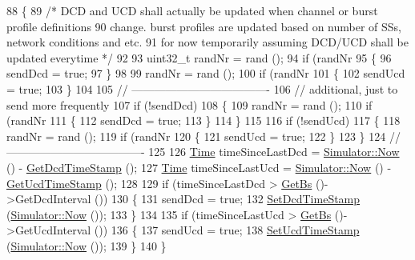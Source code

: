 \begin{DoxyCode}
88 \{
89   \textcolor{comment}{/* DCD and UCD shall actually be updated when channel or burst profile definitions}
90 \textcolor{comment}{   change. burst profiles are updated based on number of SSs, network conditions and etc.}
91 \textcolor{comment}{   for now temporarily assuming DCD/UCD shall be updated everytime */}
92 
93   uint32\_t randNr = rand ();
94   \textcolor{keywordflow}{if} (randNr %
95     \{
96       sendDcd = \textcolor{keyword}{true};
97     \}
98 
99   randNr = rand ();
100   \textcolor{keywordflow}{if} (randNr %
101     \{
102       sendUcd = \textcolor{keyword}{true};
103     \}
104 
105   \textcolor{comment}{// -------------------------------------}
106   \textcolor{comment}{// additional, just to send more frequently}
107   \textcolor{keywordflow}{if} (!sendDcd)
108     \{
109       randNr = rand ();
110       \textcolor{keywordflow}{if} (randNr %
111         \{
112           sendDcd = \textcolor{keyword}{true};
113         \}
114     \}
115 
116   \textcolor{keywordflow}{if} (!sendUcd)
117     \{
118       randNr = rand ();
119       \textcolor{keywordflow}{if} (randNr %
120         \{
121           sendUcd = \textcolor{keyword}{true};
122         \}
123     \}
124   \textcolor{comment}{// -------------------------------------}
125 
126   \hyperlink{namespacens3_1_1TracedValueCallback_a7ffd3e7c142ffe7c8a1d2db9b8de38ec}{Time} timeSinceLastDcd = \hyperlink{classns3_1_1Simulator_ac3178fa975b419f7875e7105be122800}{Simulator::Now} () - \hyperlink{classns3_1_1UplinkScheduler_a3db19e92a24c71af7d6aff5e94d488fe}{GetDcdTimeStamp} ();
127   \hyperlink{namespacens3_1_1TracedValueCallback_a7ffd3e7c142ffe7c8a1d2db9b8de38ec}{Time} timeSinceLastUcd = \hyperlink{classns3_1_1Simulator_ac3178fa975b419f7875e7105be122800}{Simulator::Now} () - \hyperlink{classns3_1_1UplinkScheduler_a709e1a0e3c5ab174b0e1bc123dcfd676}{GetUcdTimeStamp} ();
128 
129   \textcolor{keywordflow}{if} (timeSinceLastDcd > \hyperlink{classns3_1_1UplinkScheduler_afe61b7de71d92d2dff1b135744a6ff7e}{GetBs} ()->GetDcdInterval ())
130     \{
131       sendDcd = \textcolor{keyword}{true};
132       \hyperlink{classns3_1_1UplinkScheduler_a18ccfd91b3f58a55f7249bbafb858f5c}{SetDcdTimeStamp} (\hyperlink{classns3_1_1Simulator_ac3178fa975b419f7875e7105be122800}{Simulator::Now} ());
133     \}
134 
135   \textcolor{keywordflow}{if} (timeSinceLastUcd > \hyperlink{classns3_1_1UplinkScheduler_afe61b7de71d92d2dff1b135744a6ff7e}{GetBs} ()->GetUcdInterval ())
136     \{
137       sendUcd = \textcolor{keyword}{true};
138       \hyperlink{classns3_1_1UplinkScheduler_a0dff82b69865688622c0453a35bffe98}{SetUcdTimeStamp} (\hyperlink{classns3_1_1Simulator_ac3178fa975b419f7875e7105be122800}{Simulator::Now} ());
139     \}
140 \}
\end{DoxyCode}


